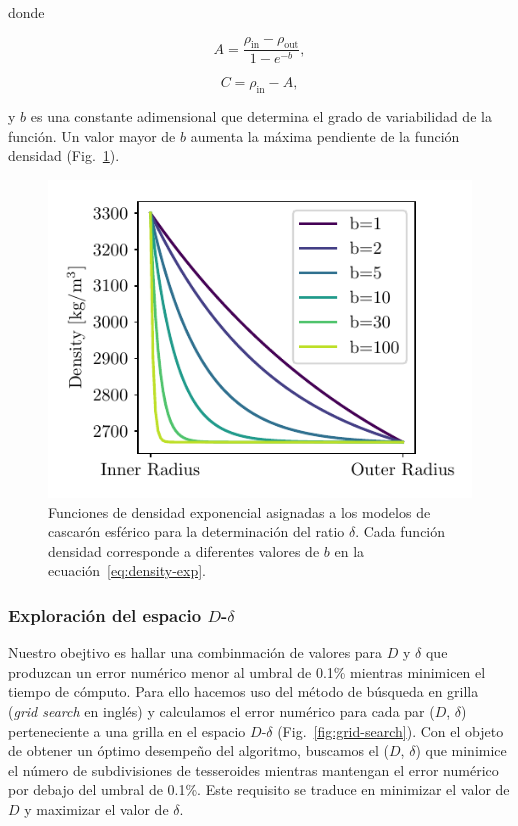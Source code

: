 \noindent donde

\begin{equation}
    A = \frac{\rho_\text{in} - \rho_\text{out}}{1 - e^{-b}},
\end{equation}

\begin{equation}
    C = \rho_\text{in} - A,
\end{equation}

\noindent y $b$ es una constante adimensional que determina el grado de
variabilidad de la función. Un valor mayor de $b$ aumenta la máxima pendiente
de la función densidad (Fig.~\ref{fig:exp-densities}).

\begin{figure}
\centering
\includegraphics[width=0.5\linewidth]{figs/tesseroids-variable-density/exponential-densities.pdf}
\caption{
    Funciones de densidad exponencial asignadas a los modelos de cascarón
    esférico para la determinación del ratio $\delta$.
    Cada función densidad corresponde a diferentes valores de $b$ en la
    ecuación~\ref{eq:density-exp}.
}
\label{fig:exp-densities}
\end{figure}


\subsubsection{Exploración del espacio $D$-$\delta$}

Nuestro obejtivo es hallar una combinmación de valores para $D$ y $\delta$ que
produzcan un error numérico menor al umbral de 0.1\% mientras minimicen el
tiempo de cómputo.
Para ello hacemos uso del método de búsqueda en grilla (\emph{grid search} en
inglés) y calculamos el error numérico para cada par ($D$, $\delta$)
perteneciente a una grilla en el espacio $D$-$\delta$
(Fig.~\ref{fig:grid-search}).
Con el objeto de obtener un óptimo desempeño del algoritmo, buscamos el ($D$,
$\delta$) que minimice el número de subdivisiones de tesseroides mientras
mantengan el error numérico por debajo del umbral de 0.1\%.
Este requisito se traduce en minimizar el valor de $D$ y maximizar el valor de
$\delta$.

